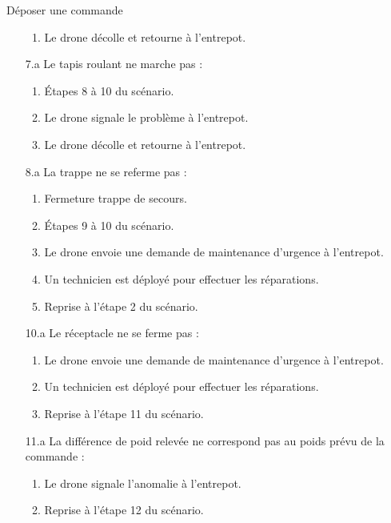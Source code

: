 \begin{UseCase}{Déposer une commande}
\begin{UseCaseExtension}
\begin{enumerate}
\begin{enumerate}
                \item Le drone décolle et retourne à l'entrepot.
            \end{enumerate}
        \item[7.a] Le tapis roulant ne marche pas :
            \begin{enumerate}
                \item Étapes 8 à 10 du scénario.
                \item Le drone signale le problème à l'entrepot.
                \item Le drone décolle et retourne à l'entrepot.
            \end{enumerate}
        \item[8.a] La trappe ne se referme pas :
            \begin{enumerate}
                \item Fermeture trappe de secours.
                \item Étapes 9 à 10 du scénario.
                \item Le drone envoie une demande de maintenance d'urgence à
                    l'entrepot.
                \item Un technicien est déployé pour effectuer les réparations.
                \item Reprise à l'étape 2 du scénario.
            \end{enumerate}
        \item[10.a] Le réceptacle ne se ferme pas :
            \begin{enumerate}
                \item Le drone envoie une demande de maintenance d'urgence à
                    l'entrepot.
                \item Un technicien est déployé pour effectuer les réparations.
                \item Reprise à l'étape 11 du scénario.
            \end{enumerate}
        \item[11.a] La différence de poid relevée ne correspond pas au poids
            prévu
            de la commande :
            \begin{enumerate}
                \item Le drone signale l'anomalie à l'entrepot.
                \item Reprise à l'étape 12 du scénario.
            \end{enumerate}
    \end{enumerate}
\end{UseCaseExtension}

\end{UseCase}
